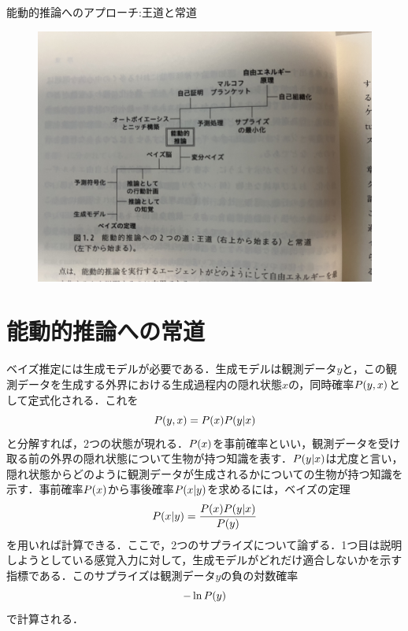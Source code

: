 \documentclass[a4paper]{jsarticle}
\begin{document}
能動的推論へのアプローチ\;:\;王道と常道
\begin{figure}[htbp]
   \centering
   \includegraphics[scale=0.13]{approachtoAI.jpg}
\end{figure}

\section{能動的推論への常道}
ベイズ推定には生成モデルが必要である．生成モデルは観測データ$y$と，この観測データを生成する外界における生成過程内の隠れ状態$x$の，同時確率$P\qty(y,x)$として定式化される．これを
\begin{equation}
    P\qty(y,x)=P(x)P\qty(y|x)
\end{equation}
と分解すれば，2つの状態が現れる．$P\qty(x)$を事前確率といい，観測データを受け取る前の外界の隠れ状態について生物が持つ知識を表す．$P\qty(y|x)$は尤度と言い，隠れ状態からどのように観測データが生成されるかについての生物が持つ知識を示す．事前確率$P\qty(x)$から事後確率$P\qty(x|y)$を求めるには，ベイズの定理
\begin{equation}
    P(x|y)=\frac{P\qty(x)P\qty(y|x)}{P\qty(y)}
\end{equation}
を用いれば計算できる．ここで，2つのサプライズについて論ずる．1つ目は説明しようとしている感覚入力に対して，生成モデルがどれだけ適合しないかを示す指標である．このサプライズは観測データ$y$の負の対数確率
\begin{equation}
    -\ln P\qty(y)
\end{equation}
で計算される．
\end{document}
